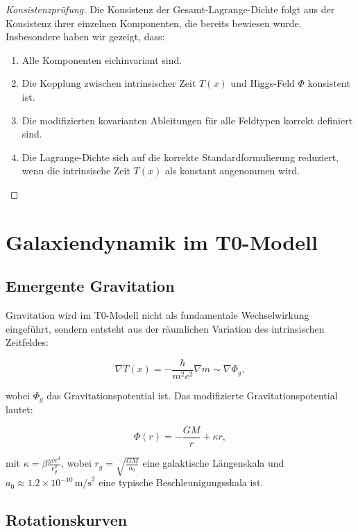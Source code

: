 \documentclass[a4paper,12pt]{article}
\newcommand{\Tfield}{T(x)}
\begin{document}
	\begin{proof}[Konsistenzprüfung]
		Die Konsistenz der Gesamt-Lagrange-Dichte folgt aus der Konsistenz ihrer einzelnen Komponenten, die bereits bewiesen wurde. Insbesondere haben wir gezeigt, dass:
		\begin{enumerate}
			\item Alle Komponenten eichinvariant sind.
			\item Die Kopplung zwischen intrinsischer Zeit \( \Tfield \) und Higgs-Feld \( \Phi \) konsistent ist.
			\item Die modifizierten kovarianten Ableitungen für alle Feldtypen korrekt definiert sind.
			\item Die Lagrange-Dichte sich auf die korrekte Standardformulierung reduziert, wenn die intrinsische Zeit \( \Tfield \) als konstant angenommen wird.
		\end{enumerate}
	\end{proof}
	
	\section{Galaxiendynamik im T0-Modell}
	
	\subsection{Emergente Gravitation}
	
	Gravitation wird im T0-Modell nicht als fundamentale Wechselwirkung eingeführt, sondern entsteht aus der räumlichen Variation des intrinsischen Zeitfeldes:
	
	\begin{equation}
		\nabla \Tfield = -\frac{\hbar}{m^2 c^2} \nabla m \sim \nabla \Phi_g,
	\end{equation}
	
	wobei \( \Phi_g \) das Gravitationspotential ist. Das modifizierte Gravitationspotential lautet:
	
	\begin{equation}
		\Phi(r) = -\frac{G M}{r} + \kappa r,
	\end{equation}
	
	mit \( \kappa = \beta \frac{y v c^4}{r_g^2} \), wobei \( r_g = \sqrt{\frac{G M}{a_0}} \) eine galaktische Längenskala und \( a_0 \approx 1.2 \times 10^{-10} \, \text{m/s}^2 \) eine typische Beschleunigungsskala ist.
	
	\subsection{Rotationskurven}
	
\end{document}

